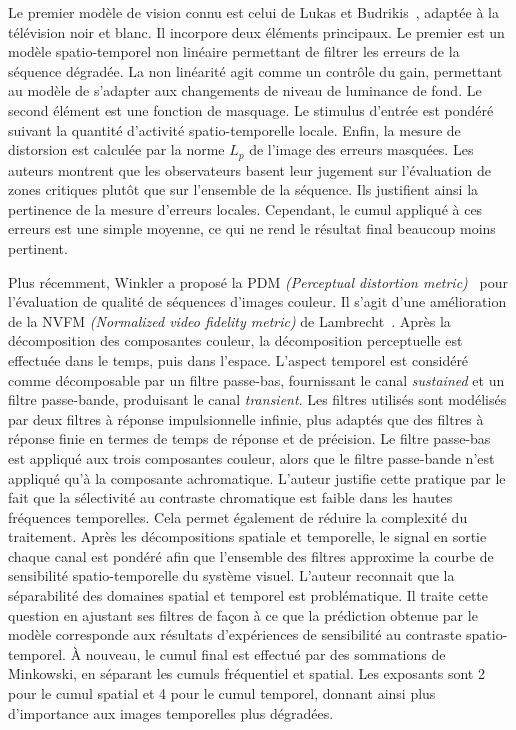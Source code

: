 Le premier modèle de vision connu est celui de Lukas et Budrikis~\cite{lukas-PQMonVM}, adaptée à la télévision noir et blanc. Il incorpore deux éléments principaux. Le premier est un modèle spatio-temporel non linéaire permettant de filtrer les erreurs de la séquence dégradée. La non linéarité agit comme un contrôle du gain, permettant au modèle de s'adapter aux changements de niveau de luminance de fond. Le second élément est une fonction de masquage. Le stimulus d'entrée est pondéré suivant la quantité d'activité spatio-temporelle locale. Enfin, la mesure de distorsion est calculée par la norme $L_p$ de l'image des erreurs masquées. Les auteurs montrent que les observateurs basent leur jugement sur l'évaluation de zones critiques plutôt que sur l'ensemble de la séquence. Ils justifient ainsi la pertinence de la mesure d'erreurs locales. Cependant, le cumul appliqué à ces erreurs est une simple moyenne, ce qui ne rend le résultat final beaucoup moins pertinent.

Plus récemment, Winkler a proposé la PDM \emph{(Perceptual distortion metric)}~\cite{winkler-hvei1999} pour l’évaluation de qualité de séquences d’images couleur. Il s'agit d'une amélioration de la NVFM \emph{(Normalized video fidelity metric)} de Lambrecht~\cite{lindh-icip1996}. Après la décomposition des composantes couleur, la décomposition perceptuelle est effectuée dans le temps, puis dans l'espace. L'aspect temporel est considéré comme décomposable par un filtre passe-bas, fournissant le canal \emph{sustained} et un filtre passe-bande, produisant le canal \emph{transient}. Les filtres utilisés sont modélisés par deux filtres à réponse impulsionnelle infinie, plus adaptés que des filtres à réponse finie en termes de temps de réponse et de précision. Le filtre passe-bas est appliqué aux trois composantes couleur, alors que le filtre passe-bande n'est appliqué qu'à la composante achromatique. L'auteur justifie cette pratique par le fait que la sélectivité au contraste chromatique est faible dans les hautes fréquences temporelles. Cela permet également de réduire la complexité du traitement. Après les décompositions spatiale et temporelle, le signal en sortie chaque canal est pondéré afin que l’ensemble des filtres approxime la courbe de sensibilité spatio-temporelle du système visuel. L'auteur reconnait que la séparabilité des domaines spatial et temporel est problématique. Il traite cette question en ajustant ses filtres de façon à ce que la prédiction obtenue par le modèle corresponde aux résultats d'expériences de sensibilité au contraste spatio-temporel. À nouveau, le cumul final est effectué par des sommations de Minkowski, en séparant les cumuls fréquentiel et spatial. Les exposants sont 2 pour le cumul spatial et 4 pour le cumul temporel, donnant ainsi plus d'importance aux images temporelles plus dégradées.

